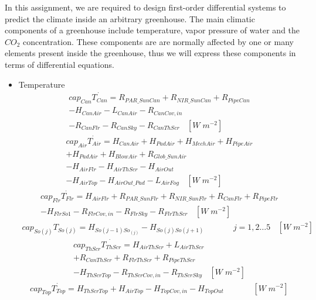 \documentclass[a4paper]{article}
\begin{document}
In this assignment, we are required to design first-order differential systems to predict the climate inside an arbitrary greenhouse.
The main climatic components of a greenhouse include temperature, vapor pressure of water and the \(CO_2\) concentration.
These components are are normally affected by one or many elements present inside the greenhouse, thus we will express these components in terms of differential equations.
\begin{itemize}
  \item Temperature
        \begin{multline}
          cap_{Can}\dot{T_{Can}} = {}R_{PAR\_SunCan} + R_{NIR\_SunCan} + R_{PipeCan} \\
          - H_{CanAir} - L_{CanAir} - R_{CanCov,in} \\
          - R_{CanFlr} - R_{CanSky} - R_{CanThScr} ~~~~ [W\;m^{-2}]
        \end{multline}
        \begin{multline}
          cap_{Air}\dot{T_{Air}} = H_{CanAir} + H_{PadAir} + H_{MechAir} + H_{PipeAir} \\
          + H_{PadAir} + H_{BlowAir} + R_{Glob\_SunAir} \\
          - H_{AirFlr} - H_{AirThScr} - H_{AirOut} \\
          - H_{AirTop} - H_{AirOut\_Pad} - L_{AirFog} ~~~~ [W\;m^{-2}]
        \end{multline}
        \begin{multline}
          cap_{Flr}\dot{T_{Flr}} = H_{AirFlr} + R_{PAR\_SunFlr} + R_{NIR\_SunFlr} + R_{CanFlr} + R_{PipeFlr} \\
          - H_{FlrSo1} - R_{FlrCov,in} - R_{FlrSky} - R_{FlrThScr} ~~~~ [W\;m^{-2}]
        \end{multline}
        \begin{multline}
          cap_{So(j)}T_{So(j)} = H_{So(j-1)So_{(j)}} - H_{So(j)So(j+1)} ~~~~~~~~~~~~~~~~ j=1,2\dots5 ~~~~ [W\;m^{-2}]
        \end{multline}
        \begin{multline}
          cap_{ThScr}\dot{T_{ThScr}} = H_{AirThScr} + L_{AirThScr} \\
          + R_{CanThScr} + R_{FlrThScr} + R_{PipeThScr} \\
          - H_{ThScrTop} - R_{ThScrCov,in} - R_{ThScrSky} ~~~~ [W\;m^{-2}]
        \end{multline}
        \begin{multline}
          cap_{Top}\dot{T_{Top}} = H_{ThScrTop} + H_{AirTop} - H_{TopCov,in} - H_{TopOut} ~~~~~~~~~~~~~~~~ [W\;m^{-2}]

\end{multline}
\end{itemize}
\end{document}
